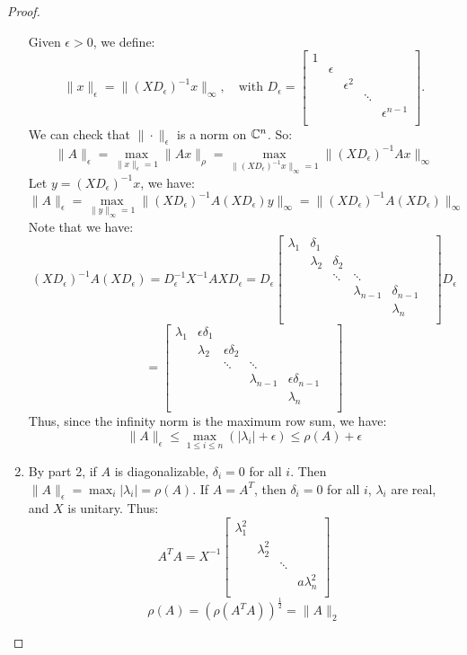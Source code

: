 \documentclass[../main/main.tex]{subfiles}
\begin{document}
\begin{proof}
\begin{enumerate}
          Given $\epsilon > 0$, we define: \[
          \|x\|_{\epsilon} = \|(X D_{\epsilon})^{-1} x\|_{\infty}, \quad \text{with }D_{\epsilon} = \begin{bmatrix}
1&&&& \\
&\epsilon&&& \\
&&\epsilon^2&& \\
&&&\ddots& \\
&&&&\epsilon^{n-1} \\
          \end{bmatrix}.
          \] We can check that $\|\cdot\|_{\epsilon}$ is a norm on $\mathbb{C}^{n}$. So: \[
\|A\|_{\epsilon} = \max_{\|x\|_{\epsilon}=1} \|Ax\|_{\rho} = \max_{\|(XD_{\epsilon})^{-1} x\|_{\infty}=1} \|(XD_{\epsilon})^{-1}Ax\|_{\infty}
          \]Let $y=(XD_{\epsilon})^{-1} x$, we have: \[
          \|A\|_{\epsilon} = \max_{\|y\|_{\infty}=1} \|(XD_{\epsilon})^{-1} A (XD_{\epsilon})y\|_{\infty} = \|(XD_{\epsilon})^{-1}A(XD_{\epsilon})\|_{\infty}
          \] Note that we have: \[
          (XD_{\epsilon})^{-1} A (XD_{\epsilon}) = D_{\epsilon}^{-1} X^{-1} A X D_{\epsilon} = D_{\epsilon} \begin{bmatrix}
      \lambda_{1}& \delta_{1}&&& \\
      & \lambda_{2} & \delta_{2}&& \\
      & & \ddots & \ddots &&\\
      & &  & \lambda_{n-1} &\delta_{n-1}\\
      &&&& \lambda_{n}  \\
          \end{bmatrix}D_{\epsilon}
          \] \[
          = \begin{bmatrix}
      \lambda_{1}&\epsilon \delta_{1}&&& \\
      & \lambda_{2} &\epsilon \delta_{2}&& \\
      & & \ddots & \ddots &&\\
      & &  & \lambda_{n-1} &\epsilon\delta_{n-1}\\
      &&&& \lambda_{n}  \\
          \end{bmatrix}
          \]
          Thus, since the infinity norm is the maximum row sum, we have: \[
          \|A\|_{\epsilon} \leq \max_{1\leq i\leq n} (|\lambda_{i}| +\epsilon) \leq \rho(A) +\epsilon
          \]
          \item By part 2, if $A$ is diagonalizable, $\delta_{i} = 0$ for all $i$. Then $\|A\|_{\epsilon} = \max_{i} |\lambda_{i}| = \rho(A)$.
          If $A = A^{T}$, then $\delta_{i} = 0$ for all $i$, $\lambda_{i}$ are real, and $X$ is unitary. Thus: \[
          A^{T}A = X^{-1} \begin{bmatrix}
\lambda_{1}^2&&& \\
&\lambda_{2}^2&& \\
&&\ddots& \\
&&&a\lambda_{n}^2 \\

          \end{bmatrix}
          \]
          \[
          \rho(A) = (\rho(A^{T}A))^{\frac{1}{2}} = \|A\|_{2}
          \]
  \end{enumerate}

\end{proof}
\end{document}
